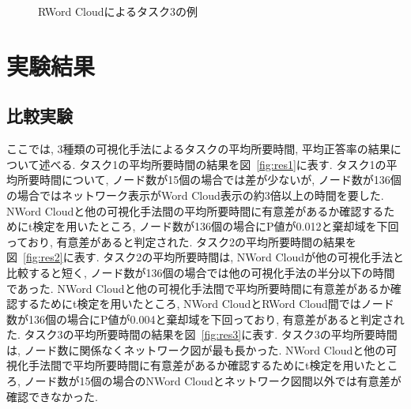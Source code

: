 \documentclass[syuuron]{kuee}
\begin{document}
		\begin{figure}
			\begin{center}
			\end{center}
			\caption{RWord Cloudによるタスク3の例}
	  		\label{fig:que3}
		\end{figure}

\chapter{実験結果}
	\section{比較実験}
	ここでは, 3種類の可視化手法によるタスクの平均所要時間, 平均正答率の結果について述べる. 
	タスク1の平均所要時間の結果を図~\ref{fig:res1}に表す. 
	タスク1の平均所要時間について, ノード数が15個の場合では差が少ないが, ノード数が136個の場合ではネットワーク表示がWord Cloud表示の約3倍以上の時間を要した. 
	NWord Cloudと他の可視化手法間の平均所要時間に有意差があるか確認するためにt検定を用いたところ, 
	ノード数が136個の場合にP値が0.012と棄却域を下回っており, 有意差があると判定された. 
	タスク2の平均所要時間の結果を図~\ref{fig:res2}に表す. 
	タスク2の平均所要時間は, NWord Cloudが他の可視化手法と比較すると短く, 
	ノード数が136個の場合では他の可視化手法の半分以下の時間であった. 
	NWord Cloudと他の可視化手法間で平均所要時間に有意差があるか確認するためにt検定を用いたところ, 
	NWord CloudとRWord Cloud間ではノード数が136個の場合にP値が0.004と棄却域を下回っており, 有意差があると判定された. 
	タスク3の平均所要時間の結果を図~\ref{fig:res3}に表す. 
	タスク3の平均所要時間は, ノード数に関係なくネットワーク図が最も長かった. 
	NWord Cloudと他の可視化手法間で平均所要時間に有意差があるか確認するためにt検定を用いたところ, 
	ノード数が15個の場合のNWord Cloudとネットワーク図間以外では有意差が確認できなかった. 
	
\end{document}
